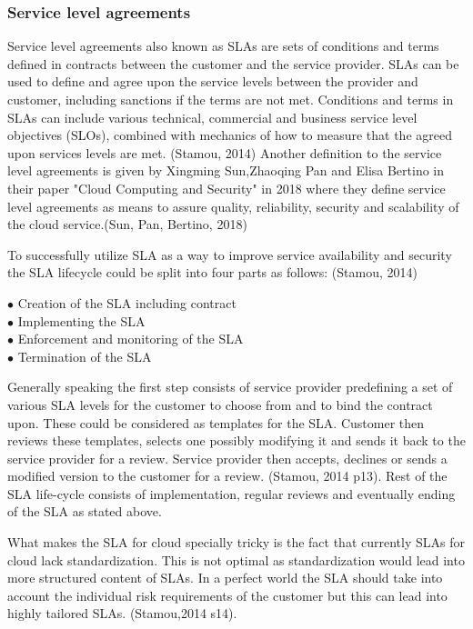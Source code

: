 \documentclass{article}
\begin{document}
\subsubsection{Service level agreements}
Service level agreements also known as SLAs are sets of conditions and terms defined in contracts between the customer and the service provider. SLAs can be used to define and agree upon the service levels between the provider and customer, including sanctions if the terms are not met. Conditions and terms in SLAs can include various technical, commercial and business service level objectives (SLOs), combined with mechanics of how to measure that the agreed upon services levels are met. (Stamou, 2014) Another definition to the service level agreements is given by Xingming Sun,Zhaoqing Pan and Elisa Bertino in their paper "Cloud Computing and Security" in 2018 where they define service level agreements as means to assure quality, reliability, security and scalability of the cloud service.(Sun, Pan, Bertino, 2018) 
\par
To successfully utilize SLA as a way to improve service availability and security the SLA lifecycle could be split into four parts as follows: (Stamou, 2014)
\begin{description}
        \item[$\bullet$ Creation of the SLA including contract]
        \item[$\bullet$ Implementing the SLA]
        \item[$\bullet$ Enforcement and monitoring of the SLA]
        \item[$\bullet$ Termination of the SLA]
\end{description}
Generally speaking the first step consists of service provider predefining a set of various SLA levels for the customer to choose from and to bind the contract upon. These could be considered as templates for the SLA. Customer then reviews these templates, selects one possibly modifying it and sends it back to the service provider for a review. Service provider then accepts, declines or sends a modified version to the customer for a review. (Stamou, 2014 p13). Rest of the SLA life-cycle consists of implementation, regular reviews and eventually ending of the SLA as stated above.
\par
What makes the SLA for cloud specially tricky is the fact that currently SLAs for cloud lack standardization. This is not optimal as standardization would lead into more structured content of SLAs. In a perfect world the SLA should take into account the individual risk requirements of the customer but this can lead into highly tailored SLAs. (Stamou,2014 s14).
\end{document}
